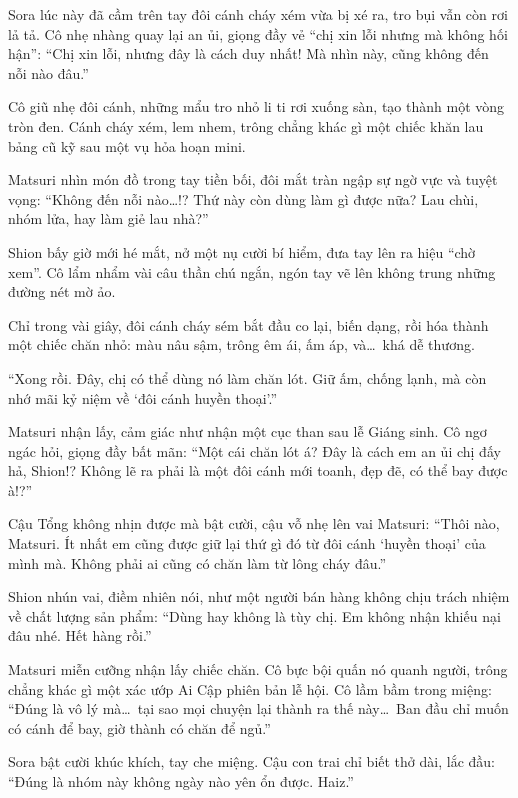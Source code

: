 \documentclass[../main.tex]{subfiles}
\begin{document}
Sora lúc này đã cầm trên tay đôi cánh cháy xém vừa bị xé ra, tro bụi vẫn còn rơi lả tả. Cô nhẹ nhàng quay lại an ủi, giọng đầy vẻ ``chị xin lỗi nhưng mà không hối hận'': ``Chị xin lỗi, nhưng đây là cách duy nhất! Mà nhìn này, cũng không đến nỗi nào đâu.''

Cô giũ nhẹ đôi cánh, những mẩu tro nhỏ li ti rơi xuống sàn, tạo thành một vòng tròn đen. Cánh cháy xém, lem nhem, trông chẳng khác gì một chiếc khăn lau bảng cũ kỹ sau một vụ hỏa hoạn mini.

Matsuri nhìn món đồ trong tay tiền bối, đôi mắt tràn ngập sự ngờ vực và tuyệt vọng: ``Không đến nỗi nào…!? Thứ này còn dùng làm gì được nữa? Lau chùi, nhóm lửa, hay làm giẻ lau nhà?''

Shion bấy giờ mới hé mắt, nở một nụ cười bí hiểm, đưa tay lên ra hiệu ``chờ xem''. Cô lẩm nhẩm vài câu thần chú ngắn, ngón tay vẽ lên không trung những đường nét mờ ảo.

Chỉ trong vài giây, đôi cánh cháy sém bắt đầu co lại, biến dạng, rồi hóa thành một chiếc chăn nhỏ: màu nâu sậm, trông êm ái, ấm áp, và\dots\ khá dễ thương.

``Xong rồi. Đây, chị có thể dùng nó làm chăn lót. Giữ ấm, chống lạnh, mà còn nhớ mãi kỷ niệm về `đôi cánh huyền thoại'.''

Matsuri nhận lấy, cảm giác như nhận một cục than sau lễ Giáng sinh. Cô ngơ ngác hỏi, giọng đầy bất mãn: ``Một cái chăn lót á? Đây là cách em an ủi chị đấy hả, Shion!? Không lẽ ra phải là một đôi cánh mới toanh, đẹp đẽ, có thể bay được à!?''

Cậu Tổng không nhịn được mà bật cười, cậu vỗ nhẹ lên vai Matsuri: ``Thôi nào, Matsuri. Ít nhất em cũng được giữ lại thứ gì đó từ đôi cánh `huyền thoại' của mình mà. Không phải ai cũng có chăn làm từ lông cháy đâu.''

Shion nhún vai, điềm nhiên nói, như một người bán hàng không chịu trách nhiệm về chất lượng sản phẩm: ``Dùng hay không là tùy chị. Em không nhận khiếu nại đâu nhé. Hết hàng rồi.''

Matsuri miễn cưỡng nhận lấy chiếc chăn. Cô bực bội quấn nó quanh người, trông chẳng khác gì một xác ướp Ai Cập phiên bản lễ hội. Cô lầm bầm trong miệng: ``Đúng là vô lý mà\dots\ tại sao mọi chuyện lại thành ra thế này\dots\ Ban đầu chỉ muốn có cánh để bay, giờ thành có chăn để ngủ.''

Sora bật cười khúc khích, tay che miệng. Cậu con trai chỉ biết thở dài, lắc đầu: ``Đúng là nhóm này không ngày nào yên ổn được. Haiz.''

\ct
\end{document}
